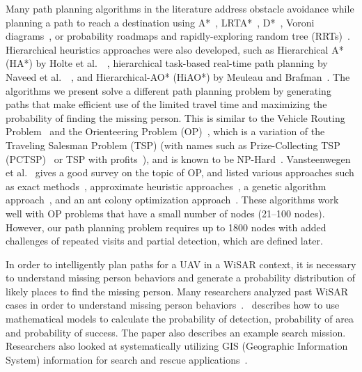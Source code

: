 Many path planning algorithms in the literature address obstacle avoidance while planning a path to reach a destination using A*~\cite{Quigley2005Towards}, LRTA*~\cite{Howlett2006Learning}, D*~\cite{Stentz1997Optimal}, Voroni diagrams~\cite{Bortoff2000Path,Beard2005Autonomous}, or probability roadmaps and rapidly-exploring random tree (RRTs)~\cite{Pettersson2006Probabilistic}. Hierarchical heuristics approaches were also developed, such as Hierarchical A* (HA*) by Holte et al.\ ~\cite{Holte1996Hierarchical}, hierarchical task-based real-time path planning by Naveed et al.\ ~\cite{Meuleau2007Hierarchical}, and Hierarchical-AO* (HiAO*) by Meuleau and Brafman~\cite{Naveed2010Hierarchical}. The algorithms we present solve a different path planning problem by generating paths that make efficient use of the limited travel time and maximizing the probability of finding the missing person. This is similar to the Vehicle Routing Problem~\cite{Laporte1992Vehicle} and the Orienteering Problem (OP)~\cite{Golden1987Orienteering}, which is a variation of the Traveling Salesman Problem (TSP) (with names such as Prize-Collecting TSP (PCTSP)~\cite{Gutin2002Traveling} or TSP with profits~\cite{Feillet2005Traveling}), and is known to be NP-Hard~\cite{Sokkappa1990Cost}. Vansteenwegen et al.\ \cite{Vansteenwegen2011Orienteering} gives a good survey on the topic of OP, and listed various approaches such as exact methods~\cite{Laporte1990Selective,Fischetti1998Solving,Ramesh1992Optimal}, approximate heuristic approaches~\cite{Mittenthal1992Insert,Chao1996Fast,Ramesh1992Optimal}, a genetic algorithm approach~\cite{Tasgetiren2000Genetic}, and an ant colony optimization approach~\cite{Liang2006Ant}. These algorithms work well with OP problems that have a small number of nodes (21--100 nodes). However, our path planning problem requires up to 1800 nodes with added challenges of repeated visits and partial detection, which are defined later.
 
In order to intelligently plan paths for a UAV in a WiSAR context, it is necessary to understand missing person behaviors and generate a probability distribution of likely places to find the missing person. Many researchers analyzed past WiSAR cases in order to understand missing person behaviors~\cite{Setnicka1980Wilderness,Hill1998Lost,Syrotuck2000Analysis,Heth1998Characteristics,Koester2008Lost}.~\cite{Syrotuck2000Introduction} describes how to use mathematical models to calculate the probability of detection, probability of area and probability of success. The paper also describes an example search mission. Researchers also looked at systematically utilizing GIS (Geographic Information System) information for search and rescue applications~\cite{Ferguson2008GIS,Soylemez2006Utility}.

